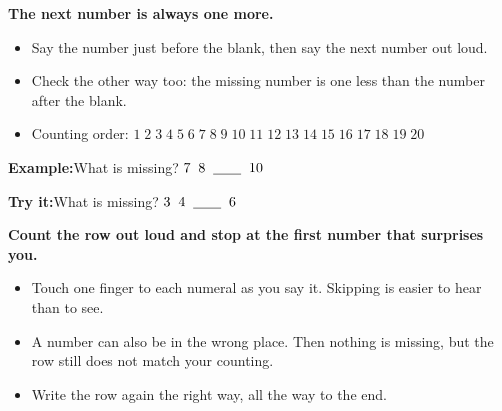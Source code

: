 \documentclass[14pt]{extarticle}
\begin{document}


\begin{formulabox}
\textbf{The next number is always one more.}
\begin{itemize}[leftmargin=0.8cm, itemsep=0pt, topsep=1pt]
  \item Say the number just before the blank, then say the next number out loud.
  \item Check the other way too: the missing number is one less than the number after the blank.
  \item Counting order: $1\;2\;3\;4\;5\;6\;7\;8\;9\;10\;11\;12\;13\;14\;15\;16\;17\;18\;19\;20$
\end{itemize}
\end{formulabox}

\begin{examplebox}
\textbf{Example:}\quad What is missing? $7\;\;8\;\;\underline{\hspace{0.7cm}}\;\;10$
\end{examplebox}

\begin{tryitbox}
\textbf{Try it:}\quad What is missing? $3\;\;4\;\;\underline{\hspace{0.7cm}}\;\;6$\\[2pt]
\end{tryitbox}


\begin{formulabox}
\textbf{Count the row out loud and stop at the first number that surprises you.}
\begin{itemize}[leftmargin=0.8cm, itemsep=0pt, topsep=1pt]
  \item Touch one finger to each numeral as you say it. Skipping is easier to hear than to see.
  \item A number can also be in the wrong place. Then nothing is missing, but the row still does not match your counting.
  \item Write the row again the right way, all the way to the end.
\end{itemize}
\end{formulabox}
\end{document}
